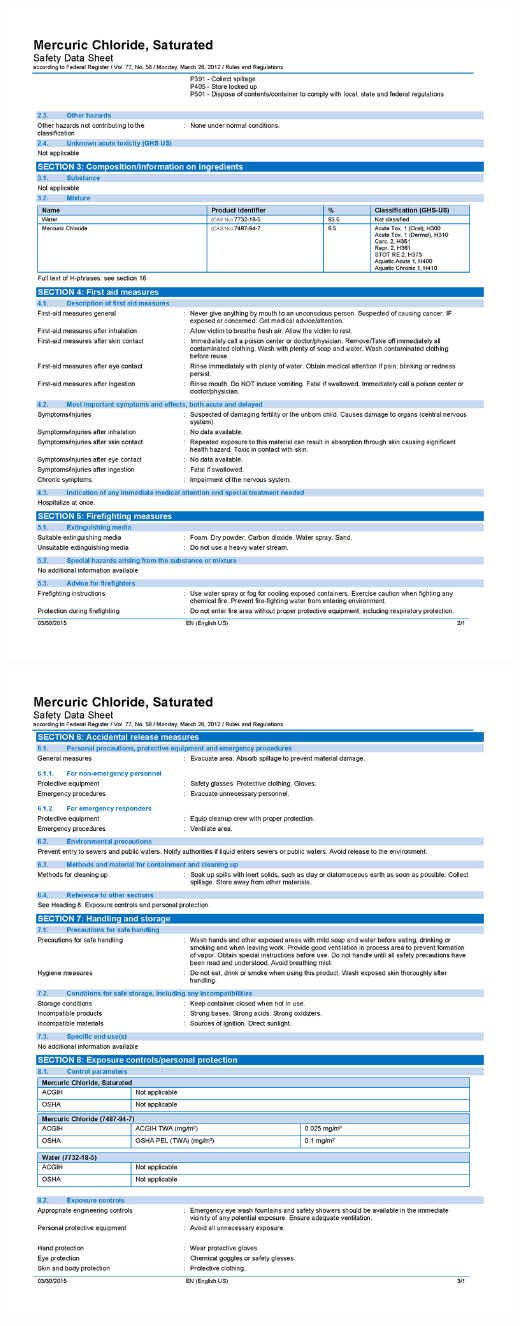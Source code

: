 \documentclass[]{book}
\begin{document}
\includegraphics[width=1\textwidth,height=\textheight]{images/Saturated-Mercuric-Chloride-SDS_Page_2.png}
\includegraphics[width=1\textwidth,height=\textheight]{images/Saturated-Mercuric-Chloride-SDS_Page_3.png}
\end{document}
